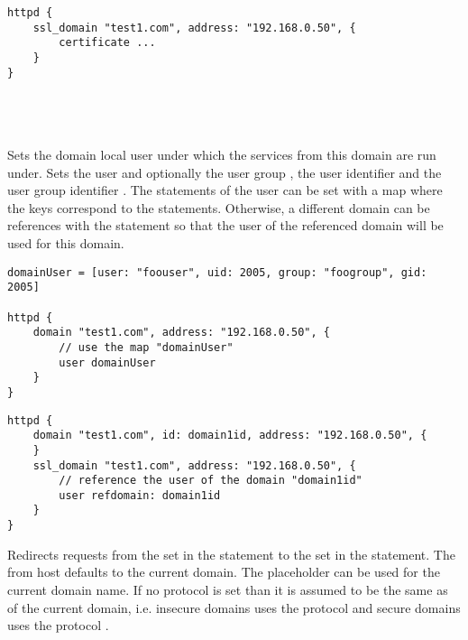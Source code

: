 \begin{lstlisting}[style=Java]
httpd {
    ssl_domain "test1.com", address: "192.168.0.50", {
        certificate ...
    }
}
\end{lstlisting}

\\
\\
\\

Sets the domain local user under which the services from this domain are 
run under. Sets the user  and optionally the user group ,
the user identifier  and the user group identifier . The
statements of the user can be set with a map where the keys correspond to the
statements. Otherwise, a different domain can be references with 
the  statement so that the user of the referenced domain
will be used for this domain.

\begin{lstlisting}[style=Java]
domainUser = [user: "foouser", uid: 2005, group: "foogroup", gid: 2005]

httpd {
    domain "test1.com", address: "192.168.0.50", {
        // use the map "domainUser"
        user domainUser
    }
}
\end{lstlisting}

\begin{lstlisting}[style=Java]
httpd {
    domain "test1.com", id: domain1id, address: "192.168.0.50", {
    }
    ssl_domain "test1.com", address: "192.168.0.50", {
        // reference the user of the domain "domain1id"
        user refdomain: domain1id
    }
}
\end{lstlisting}


Redirects requests from the  set in the  statement 
to the  set in the  statement. The from host defaults
to the current domain. The placeholder \qcode{\%} can be used for the current
domain name. If no protocol is set than it is assumed to be the same as of 
the current domain, i.e. insecure domains uses the protocol 
and secure domains uses the protocol .

